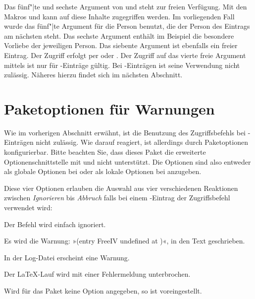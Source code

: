 Das fünf"|te und sechste Argument von  und
 steht zur freien Verfügung.  Mit den Makros
 und  kann auf diese Inhalte zugegriffen werden. Im
vorliegenden Fall wurde das fünf"|te Argument für die Person benutzt, die der
Person des Eintrags am nächsten steht. Das sechste Argument enthält im
Beispiel die besondere Vorliebe der jeweiligen Person.  Das siebente Argument
ist ebenfalls ein freier Eintrag. Der Zugriff erfolgt per  oder
.  Der Zugriff auf das vierte freie Argument mittels
 ist nur für -Einträge gültig.
Bei -Einträgen ist seine Verwendung nicht
zulässig. Näheres hierzu findet sich im nächsten Abschnitt.
%
\EndIndexGroup
\EndIndexGroup


\section{Paketoptionen für Warnungen}

Wie im vorherigen Abschnitt erwähnt, ist die Benutzung des Zugriffsbefehls
 bei -Einträgen nicht
zulässig. Wie  darauf reagiert, ist allerdings durch
Paketoptionen konfigurierbar. Bitte beachten Sie, dass
dieses Paket die erweiterte Optionenschnittstelle mit
 und  nicht
unterstützt. Die Optionen sind also entweder als globale Optionen bei
 oder als lokale Optionen bei
 anzugeben.


\begin{Declaration}
\end{Declaration}
Diese vier Optionen erlauben die Auswahl aus vier verschiedenen Reaktionen
zwischen \emph{Ignorieren} bis \emph{Abbruch} falls bei einem
-Eintrag der Zugriffsbefehl 
verwendet wird:
%
\begin{labeling}[~--]{}
\item[\Option{adrFreeIVempty}] 
        Der Befehl  wird einfach ignoriert.
\item[\Option{adrFreeIVshow}] 
        Es wird die Warnung: »(entry FreeIV undefined at )«,
           in den Text geschrieben.
\item[\Option{adrFreeIVwarn}]
        In der Log-Datei erscheint eine Warnung.
\item[\Option{adrFreeIVstop}]
        Der \LaTeX{}-Lauf wird mit einer Fehlermeldung unterbrochen.
\end{labeling}
Wird für das Paket keine Option angegeben, so ist 
voreingestellt.%
\EndIndexGroup
%
\EndIndexGroup
\endinput


